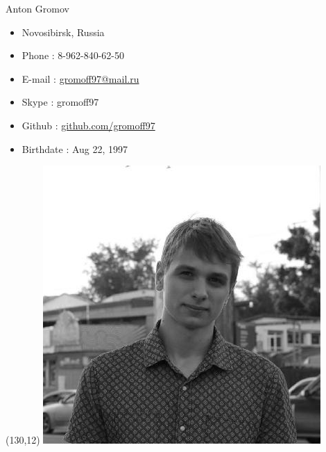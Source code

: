 \documentclass[hidelinks,12pt,a4paper,oneside]{article}
\begin{document}
%
%
%
%
\thispagestyle{empty}
{ \LARGE Anton Gromov }
\noindent{\rule{12cm}{0.5mm}}
{\large
\begin{itemize}[topsep=5pt, itemsep=-11pt]
	\item[] Novosibirsk, Russia
	\item[] Phone : 8-962-840-62-50
	\item[] E-mail : \href{mailto://gromoff97@mail.ru}{gromoff97@mail.ru}
	\item[] Skype : gromoff97
	\item[] Github : \href{https://github.com/gromoff97}{github.com/gromoff97}
	\item[] Birthdate : Aug 22, 1997
\end{itemize}
}
   \begin{textblock}{20}(130,12)
      \includegraphics[scale=0.33]{myphoto.jpg}
    \end{textblock}
\end{document}
